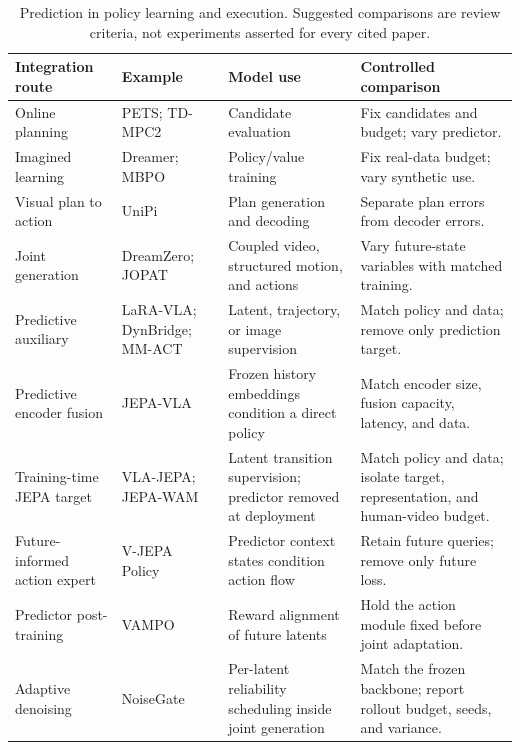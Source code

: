\begin{table}[t]
\caption{Prediction in policy learning and execution. Suggested comparisons are review criteria, not experiments asserted for every cited paper.}
\label{tab:integration}
\small
\begin{tabularx}{\linewidth}{@{}>{\raggedright\arraybackslash}p{.17\linewidth}YYY@{}}
\toprule
Integration route & Example & Model use & Controlled comparison \\
\midrule
Online planning & PETS; TD-MPC2~\cite{chua2018pets,hansen2024tdmpc2} & Candidate evaluation & Fix candidates and budget; vary predictor. \\
\addlinespace
Imagined learning & Dreamer; MBPO~\cite{hafner2020dreamer,janner2019mbpo} & Policy/value training & Fix real-data budget; vary synthetic use. \\
\addlinespace
Visual plan to action & UniPi~\cite{du2023unipi} & Plan generation and decoding & Separate plan errors from decoder errors. \\
\addlinespace
Joint generation & DreamZero; JOPAT~\cite{ye2026dreamzero,guan2026jopat} & Coupled video, structured motion, and actions & Vary future-state variables with matched training. \\
\addlinespace
Predictive auxiliary & LaRA-VLA; DynBridge; MM-ACT~\cite{bai2026laravla,wang2026dynbridge,liang2026mmact} & Latent, trajectory, or image supervision & Match policy and data; remove only prediction target. \\
\addlinespace
Predictive encoder fusion & JEPA-VLA~\cite{miao2026jepavla} & Frozen history embeddings condition a direct policy & Match encoder size, fusion capacity, latency, and data. \\
\addlinespace
Training-time JEPA target & VLA-JEPA; JEPA-WAM~\cite{sun2026vlajepa,lin2026jepawam} & Latent transition supervision; predictor removed at deployment & Match policy and data; isolate target, representation, and human-video budget. \\
\addlinespace
Future-informed action expert & V-JEPA Policy~\cite{zhang2026vjepapolicy} & Predictor context states condition action flow & Retain future queries; remove only future loss. \\
\addlinespace
Predictor post-training & VAMPO~\cite{ge2026vampo} & Reward alignment of future latents & Hold the action module fixed before joint adaptation. \\
\addlinespace
Adaptive denoising & NoiseGate~\cite{huang2026noisegate} & Per-latent reliability scheduling inside joint generation & Match the frozen backbone; report rollout budget, seeds, and variance. \\

\end{tabularx}
\end{table}
